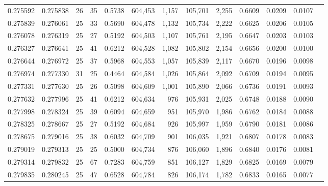 \begin{tabular}{rrrrrrrrrrrrr}
0.275592 & 0.275838 &    26 &  35 &                                     0.5738 & 604,453 &   1,157 & 105,701 &   2,255 & 0.6609 & 0.0209 & 0.0107 \\
0.275839 & 0.276061 &    25 &  33 &                                     0.5690 & 604,478 &   1,132 & 105,734 &   2,222 & 0.6625 & 0.0206 & 0.0105 \\
0.276078 & 0.276319 &    25 &  27 &                                     0.5192 & 604,503 &   1,107 & 105,761 &   2,195 & 0.6647 & 0.0203 & 0.0103 \\
0.276327 & 0.276641 &    25 &  41 &                                     0.6212 & 604,528 &   1,082 & 105,802 &   2,154 & 0.6656 & 0.0200 & 0.0100 \\
0.276644 & 0.276972 &    25 &  37 &                                     0.5968 & 604,553 &   1,057 & 105,839 &   2,117 & 0.6670 & 0.0196 & 0.0098 \\
0.276974 & 0.277330 &    31 &  25 &                                     0.4464 & 604,584 &   1,026 & 105,864 &   2,092 & 0.6709 & 0.0194 & 0.0095 \\
0.277331 & 0.277630 &    25 &  26 &                                     0.5098 & 604,609 &   1,001 & 105,890 &   2,066 & 0.6736 & 0.0191 & 0.0093 \\
0.277632 & 0.277996 &    25 &  41 &                                     0.6212 & 604,634 &     976 & 105,931 &   2,025 & 0.6748 & 0.0188 & 0.0090 \\
0.277998 & 0.278324 &    25 &  39 &                                     0.6094 & 604,659 &     951 & 105,970 &   1,986 & 0.6762 & 0.0184 & 0.0088 \\
0.278325 & 0.278667 &    25 &  27 &                                     0.5192 & 604,684 &     926 & 105,997 &   1,959 & 0.6790 & 0.0181 & 0.0086 \\
0.278675 & 0.279016 &    25 &  38 &                                     0.6032 & 604,709 &     901 & 106,035 &   1,921 & 0.6807 & 0.0178 & 0.0083 \\
0.279019 & 0.279313 &    25 &  25 &                                     0.5000 & 604,734 &     876 & 106,060 &   1,896 & 0.6840 & 0.0176 & 0.0081 \\
0.279314 & 0.279832 &    25 &  67 &                                     0.7283 & 604,759 &     851 & 106,127 &   1,829 & 0.6825 & 0.0169 & 0.0079 \\
0.279835 & 0.280245 &    25 &  47 &                                     0.6528 & 604,784 &     826 & 106,174 &   1,782 & 0.6833 & 0.0165 & 0.0077 \\

\end{tabular}
